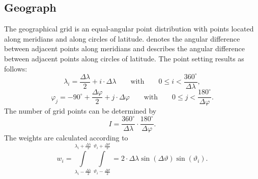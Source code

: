 \subsection{Geograph}
The geographical grid is an equal-angular point distribution with points
located along meridians and along circles of latitude. 
denotes the angular difference between adjacent points along meridians and
 describes the angular difference between adjacent points
along circles of latitude. The point setting results as follows:
\begin{equation}
\lambda_i=\frac{\Delta\lambda}{2}+i\cdot\Delta\lambda\qquad\mbox{with}\qquad 0\leq i< \frac{360^\circ}{\Delta\lambda},
\end{equation}
\begin{equation}
\varphi_j=-90^\circ+\frac{\Delta\varphi}{2}+j\cdot\Delta\varphi\qquad\mbox{with}\qquad 0\leq j<\frac{180^\circ}{\Delta\varphi}.
\end{equation}
The number of grid points can be determined by
\begin{equation}
I=\frac{360^\circ}{\Delta\lambda}\cdot\frac{180^\circ}{\Delta\varphi}.
\end{equation}
The weights are calculated according to
\begin{equation}
w_i=\int\limits_{\lambda_i-\frac{\Delta\lambda}{2}}^{\lambda_i+\frac{\Delta\lambda}{2}}\int\limits_{\vartheta_i-\frac{\Delta\vartheta}{2}}^{\vartheta_i+\frac{\Delta\vartheta}{2}}=2\cdot\Delta\lambda\sin(\Delta\vartheta)\sin(\vartheta_i).
\end{equation}


